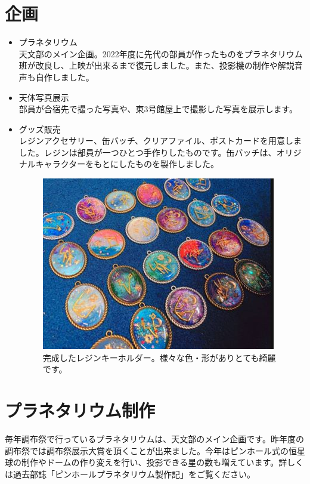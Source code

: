 \documentclass[../super_nova_20yy]{subfiles}
\begin{document}
\section{企画}

\begin{itemize}
  \item プラネタリウム\hbox{}\\
  天文部のメイン企画。2022年度に先代の部員が作ったものをプラネタリウム班が改良し、上映が出来るまで復元しました。また、投影機の制作や解説音声も自作しました。
  \item 天体写真展示\hbox{}\\
  部員が合宿先で撮った写真や、東3号館屋上で撮影した写真を展示します。
  \item グッズ販売\hbox{}\\
  レジンアクセサリー、缶バッチ、クリアファイル、ポストカードを用意しました。レジンは部員が一つひとつ手作りしたものです。缶バッチは、オリジナルキャラクターをもとにしたものを製作しました。\hbox{}\\
  \begin{figure}
    \centering
    \includegraphics[width=.5\columnwidth]{画像8.jpg}
    \caption{完成したレジンキーホルダー。様々な色・形がありとても綺麗です。}
    \label{fig:8}
  \end{figure}
\end{itemize}

\section{プラネタリウム制作}

毎年調布祭で行っているプラネタリウムは、天文部のメイン企画です。昨年度の調布祭では調布祭展示大賞を頂くことが出来ました。今年はピンホール式の恒星球の制作やドームの作り変えを行い、投影できる星の数も増えています。詳しくは過去部誌「ピンホールプラネタリウム製作記」をご覧ください。
\end{document}
